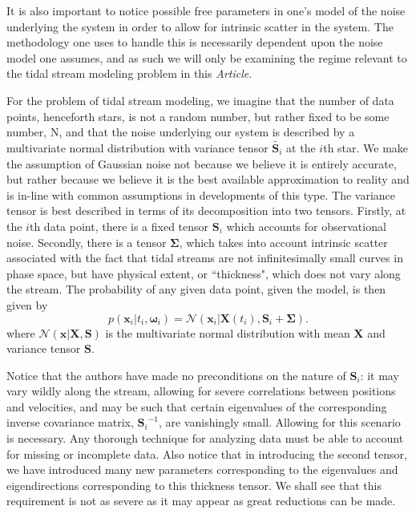 \documentclass[12pt,preprint]{aastex}
\newcommand{\mtensor}[1]{\boldsymbol{#1}}
\newcommand{\mS}{\mtensor{S}}
\newcommand{\mSigma}{\mtensor{\Sigma}}
\newcommand{\mvector}[1]{\mtensor{#1}}
\newcommand{\vx}{\mvector{x}}
\newcommand{\vX}{\mvector{X}}
\newcommand{\vomega}{\mvector{\omega}}
\newcommand{\inverse}[1]{{#1}^{-1}}
\newcommand{\normal}{\mathscr{N}}
\newcommand{\documentname}{\textsl{Article}}
\begin{document}
It is also important to notice possible free parameters in one's model of the noise underlying the system in order to allow for intrinsic scatter in the system. The methodology one uses to handle this is necessarily dependent upon the noise model one assumes, and as such we will only be examining the regime relevant to the tidal stream modeling problem in this \documentname. 

For the problem of tidal stream modeling, we imagine that the number of data points, henceforth stars, is not a random number, but rather fixed to be some number, N, and that the noise underlying our system is described by a multivariate normal distribution with variance tensor $\tilde{\mS_i}$ at the $i$th star. We make the assumption of Gaussian noise not because we believe it is entirely accurate, but rather because we believe it is the best available approximation to reality and is in-line with common assumptions in developments of this type. The variance tensor is best described in terms of its decomposition into two tensors. Firstly, at the $i$th data point, there is a fixed tensor $\mS_i$ which accounts for observational noise. Secondly, there is a tensor $\mSigma$, which takes into account intrinsic scatter associated with the fact that tidal streams are not infinitesimally small curves in phase space, but have physical extent, or ``thickness", which does not vary along the stream. The probability of any given data point, given the model, is then given by
\begin{equation}\label{unmarginalized_prob}
p(\vx_i | t_i, \vomega_i)  = \normal(\vx_i |\vX(t_i), \mS_i + \mSigma).
\end{equation}
where $\normal(\vx | \vX, \mS)$ is the multivariate normal distribution with mean $\vX$ and variance tensor $\mS$. 

Notice that the authors have made no preconditions on the nature of $\mS_i$: it may vary wildly along the stream, allowing for severe correlations between positions and velocities, and may be such that certain eigenvalues of the corresponding inverse covariance matrix, $\inverse{\mS_i}$, are vanishingly small. Allowing for this scenario is necessary. Any thorough technique for analyzing data must be able to account for missing or incomplete data. Also notice that in introducing the second tensor, we have introduced many new parameters corresponding to the eigenvalues and eigendirections corresponding to this thickness tensor. We shall see that this requirement is not as severe as it may appear as great reductions can be made. 
\end{document}
